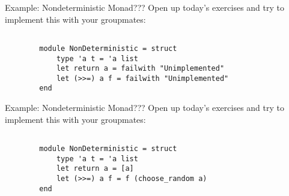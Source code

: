 \documentclass{beamer}
\begin{document}
    \begin{frame}[fragile]{Example: Nondeterministic Monad???}
        Open up today's exercises and try to implement this with your groupmates:
        
        \begin{verbatim}

        module NonDeterministic = struct
            type 'a t = 'a list
            let return a = failwith "Unimplemented"
            let (>>=) a f = failwith "Unimplemented"
        end
        \end{verbatim}
    \end{frame}
    
    
    
    \begin{frame}[fragile]{Example: Nondeterministic Monad???}
        Open up today's exercises and try to implement this with your groupmates:
        
        \begin{verbatim}

        module NonDeterministic = struct
            type 'a t = 'a list
            let return a = [a]
            let (>>=) a f = f (choose_random a)
        end
        \end{verbatim}
    \end{frame}
    
    
    
    
    
\end{document}

